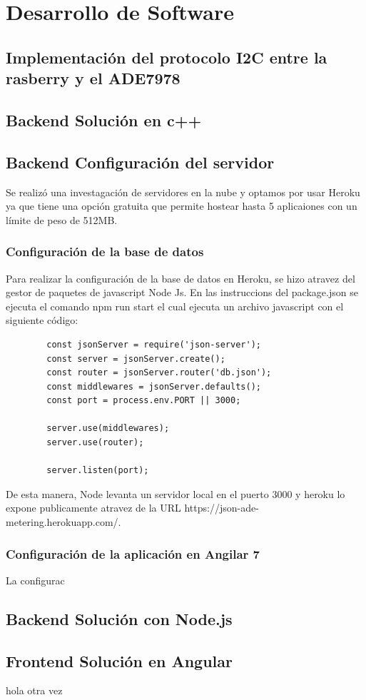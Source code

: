     \section{Desarrollo de Software}

    \subsection{Implementación del protocolo I2C entre la rasberry y el ADE7978}

    \subsection{Backend Solución en c++}
    \subsection{Backend Configuración del servidor}

    Se realizó una investagación de servidores en la nube y optamos por usar Heroku ya que tiene una opción gratuita que permite hostear hasta 5 aplicaiones con un límite de peso de 512MB. \\

    \subsubsection{Configuración de la base de datos}
    
    Para realizar la configuración de la base de datos en Heroku, se hizo atravez del gestor de paquetes de javascript Node Js. En las instruccions del package.json se ejecuta el comando npm run start el cual ejecuta un archivo javascript con el siguiente código:\\

    \begin{lstlisting}
        const jsonServer = require('json-server');
        const server = jsonServer.create();
        const router = jsonServer.router('db.json');
        const middlewares = jsonServer.defaults();
        const port = process.env.PORT || 3000;

        server.use(middlewares);
        server.use(router);

        server.listen(port);
        \end{lstlisting}
    De esta manera, Node levanta un servidor local en el puerto 3000 y heroku lo expone publicamente atravez de la URL https://json-ade-metering.herokuapp.com/.

    \subsubsection{Configuración de la aplicación en Angilar 7}

    La configurac

    
    \subsection{Backend Solución con Node.js}


    \subsection{Frontend Solución en Angular}
    hola otra vez